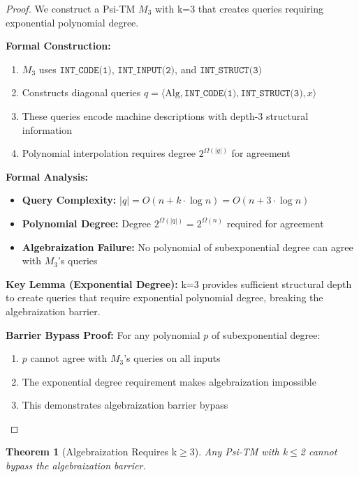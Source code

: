 \documentclass[11pt]{article}
\newtheorem{theorem}{Theorem}
\begin{document}
\begin{proof}
We construct a Psi-TM $M_3$ with k=3 that creates queries requiring exponential polynomial degree.

\textbf{Formal Construction:}
\begin{enumerate}
\item $M_3$ uses $\texttt{INT\_CODE(1)}$, $\texttt{INT\_INPUT(2)}$, and $\texttt{INT\_STRUCT(3)}$
\item Constructs diagonal queries $q = \langle \text{Alg}, \texttt{INT\_CODE(1)}, \texttt{INT\_STRUCT(3)}, x \rangle$
\item These queries encode machine descriptions with depth-3 structural information
\item Polynomial interpolation requires degree $2^{\Omega(|q|)}$ for agreement
\end{enumerate}

\textbf{Formal Analysis:}
\begin{itemize}
\item \textbf{Query Complexity:} $|q| = O(n + k \cdot \log n) = O(n + 3 \cdot \log n)$
\item \textbf{Polynomial Degree:} Degree $2^{\Omega(|q|)} = 2^{\Omega(n)}$ required for agreement
\item \textbf{Algebraization Failure:} No polynomial of subexponential degree can agree with $M_3$'s queries
\end{itemize}

\textbf{Key Lemma (Exponential Degree):} k=3 provides sufficient structural depth to create queries that require exponential polynomial degree, breaking the algebraization barrier.

\textbf{Barrier Bypass Proof:}
For any polynomial $p$ of subexponential degree:
\begin{enumerate}
\item $p$ cannot agree with $M_3$'s queries on all inputs
\item The exponential degree requirement makes algebraization impossible
\item This demonstrates algebraization barrier bypass
\end{enumerate}
\end{proof}

\begin{theorem}[Algebraization Requires k$\geq$3]
\label{thm:algebraization-k2}
Any Psi-TM with k$\leq$2 cannot bypass the algebraization barrier.
\end{theorem}
\end{document}

